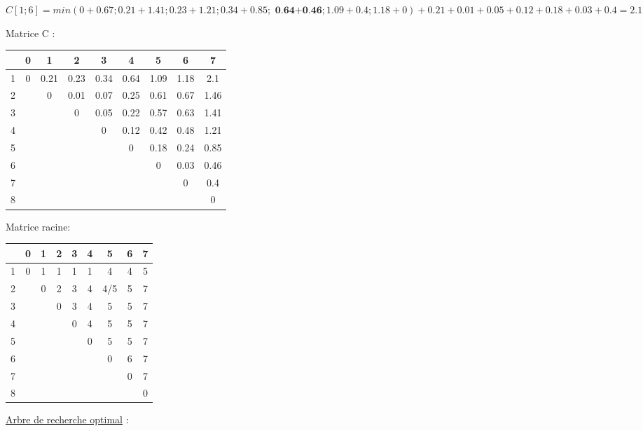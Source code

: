 \documentclass[11pt]{article}
\begin{document}
$C[1; 6] = min(0 + 0.67 ; 0.21 + 1.41; 0.23 + 1.21; 0.34 + 0.85 ;\textbf{ 0.64+0.46}; 1.09 + 0.4 ; 1.18 + 0) + 0.21 + 0.01 + 0.05 + 0.12 + 0.18 + 0.03 + 0.4= 2.1$\\ 

\begin{center}
Matrice C : \\ \smallskip
\begin{tabular}{ |c| c| c| c |c |c |c |c | c|}
 \hline 
 
& 0 & 1 & 2 & 3 & 4  & 5 & 6 & 7  \\ 
 \hline 
 \hline
1 & 0 & 0.21 & 0.23 & 0.34  & 0.64 & 1.09 & 1.18 &2.1\\
2 &  & 0 & 0.01 & 0.07  & 0.25 & 0.61 & 0.67 &1.46\\
3 &  &  & 0 & 0.05  & 0.22 & 0.57 & 0.63 &1.41\\
4 &  &  &  & 0  & 0.12 & 0.42 & 0.48 &1.21\\
5 &  &  &  &   & 0 & 0.18 & 0.24 & 0.85\\
6 & &  &  &   &  & 0 & 0.03 & 0.46\\
7 &  & &  &   &  &  & 0 & 0.4\\
8 &  &  &  &  &  &  &  &0 \\

  \hline 
\end{tabular}
\end{center}

\begin{center}
Matrice  racine:\\
\smallskip
\begin{tabular}{ |c| c| c| c |c |c |c |c | c|}
 \hline 
 
& 0 & 1 & 2 & 3 & 4  & 5 & 6 & 7  \\ 
 \hline 
 \hline
1 & 0 & 1 & 1 & 1  & 1 & 4 & 4 &5\\
2 &  & 0 & 2 & 3  & 4 & 4/5 & 5 &7\\
3 &  &  & 0 & 3  & 4 & 5 & 5 &7\\
4 &  &  &  & 0  & 4 & 5 & 5 &7\\
5 &  &  &  &   & 0 & 5 & 5 & 7\\
6 & &  &  &   &  & 0 & 6 &7\\
7 &  & &  &   &  &  & 0 & 7\\
8 &  &  &  &  &  &  &  &0 \\

  \hline 
\end{tabular}
\end{center}
\underline{Arbre de recherche optimal} :
\end{document}
